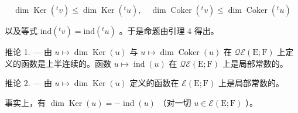 \[
\dim \operatorname{Ker} (^ {t} v) \leqslant \dim \operatorname{Ker} (^ {t} u), \quad \dim \operatorname{Coker} (^ {t} v) \leqslant \dim \operatorname{Coker} (^ {t} u)
\]

以及等式 \(\mathrm{ind}(^{t}v)=\mathrm{ind}(^{t}u)\) 。于是命题由引理 4 得出。

推论 1. --- 由 \(u \mapsto \dim \operatorname{Ker}(u)\) 与 \(u \mapsto \dim \operatorname{Coker}(u)\) 在 \(\mathcal{Q}\mathcal{E}(\mathrm{E};\mathrm{F})\) 上定义的函数是上半连续的。函数 \(u \mapsto \operatorname{ind}(u)\) 在 \(\mathcal{Q}\mathcal{E}(\mathrm{E};\mathrm{F})\) 上是局部常数的。

推论 2. --- 由 \(u \mapsto \dim \operatorname{Ker}(u)\) 定义的函数在 \(\mathcal{E}(\mathrm{E};\mathrm{F})\) 上是局部常数的。

事实上，有 \(\dim \operatorname{Ker}(u) = -\operatorname{ind}(u)\) （对一切 \(u \in \mathcal{E}(\mathrm{E};\mathrm{F})\) ）。

